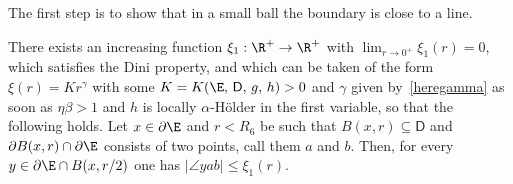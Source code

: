 The first step is to show that in a small ball the boundary is close to a line.

\begin{lem}\label{aa2bp}
There exists an increasing function $\xi_1:\R^+\to\R^+$ with $\lim_{r\to 0^+} \xi_1(r)=0$, which satisfies the Dini property, and which can be taken of the form $\xi(r)=Kr^\gamma$ with some $K=K(\E,\, \mathsf{D},\, g,\,h)>0$ and $\gamma$ given by~\eqref{heregamma} as soon as $\eta\beta>1$ and $h$ is locally $\alpha$-H\"older in the first variable, so that the following holds. Let $x\in \partial\E$ and $r<R_6$ be such that $B(x,r)\subseteq \mathsf{D}$ and $\partial B(x,r) \cap \partial\E$ consists of two points, call them $a$ and $b$. Then, for every $y \in \partial\E\cap B(x,r/2)$ one has $|\angle yab| \leq \xi_1(r)$.
\end{lem}
